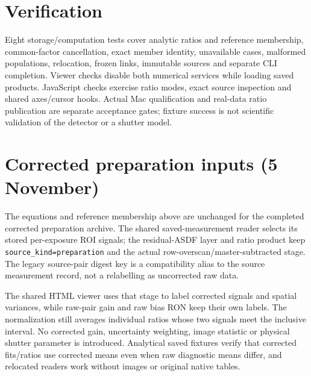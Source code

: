 \documentclass[11pt,a4paper]{article}
\begin{document}
\section*{Verification}
Eight storage/computation tests cover analytic ratios and reference membership,
common-factor cancellation, exact member identity, unavailable cases, malformed
populations, relocation, frozen links, immutable sources and separate
CLI completion. Viewer checks disable both numerical services while loading
saved products. JavaScript checks exercise ratio modes, exact source inspection
and shared axes/cursor hooks. Actual Mac qualification and real-data ratio
publication are separate acceptance gates; fixture success is not scientific
validation of the detector or a shutter model.

\section*{Corrected preparation inputs (5 November)}
The equations and reference membership above are unchanged for the completed
corrected preparation archive. The shared saved-measurement reader selects its
stored per-exposure ROI signals; the residual-ASDF layer and ratio product keep
\texttt{source\_kind=preparation} and the actual row-overscan/master-subtracted
stage. The legacy source-pair digest key is a compatibility alias to the
source measurement record, not a relabelling as uncorrected raw data.

The shared HTML viewer uses that stage to label corrected signals and spatial
variances, while raw-pair gain and raw bias RON keep their own labels. The
normalization still averages individual ratios whose two signals meet the
inclusive interval. No corrected gain, uncertainty weighting, image statistic
or physical shutter parameter is introduced. Analytical saved fixtures verify
that corrected fits/ratios use corrected means even when raw diagnostic means
differ, and relocated readers work without images or original native tables.
\end{document}
